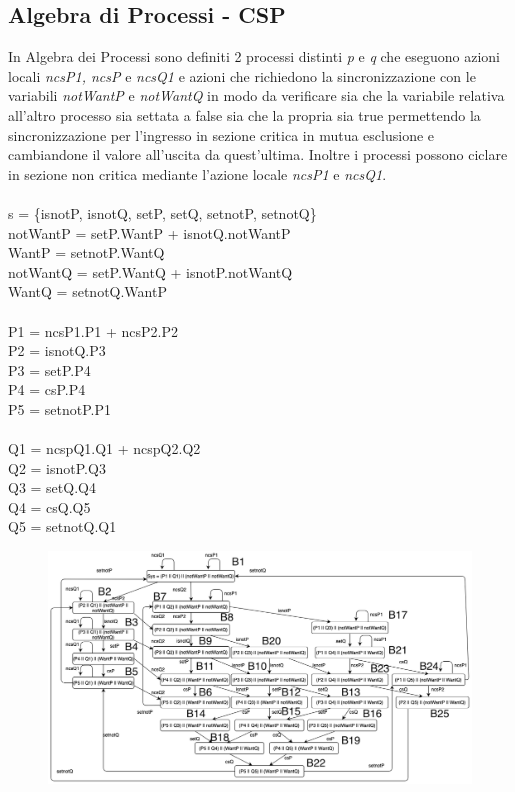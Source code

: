 \documentclass{article}
\begin{document}
\subsection{Algebra di Processi - CSP}
In Algebra dei Processi sono definiti 2 processi distinti \textit{p} e \textit{q} che eseguono azioni locali \textit{ncsP1, ncsP} e \textit{ncsQ1} e azioni che richiedono la sincronizzazione con le variabili \textit{notWantP} e \textit{notWantQ} in modo da verificare sia che la variabile relativa all'altro processo sia settata a false sia che la propria sia true permettendo la sincronizzazione per l'ingresso in sezione critica in mutua esclusione e cambiandone il valore all'uscita da quest'ultima. Inoltre i processi possono ciclare in sezione non critica mediante l'azione locale \textit{ncsP1} e \textit{ncsQ1}.
\\\\s = \{isnotP, isnotQ, setP, setQ, setnotP, setnotQ\}
\\notWantP = setP.WantP + isnotQ.notWantP
\\WantP =  setnotP.WantQ
\\notWantQ = setP.WantQ + isnotP.notWantQ 
\\WantQ = setnotQ.WantP
\\
\\P1 = ncsP1.P1 + ncsP2.P2 
\\P2 = isnotQ.P3
\\P3 = setP.P4
\\P4 = csP.P4
\\P5 = setnotP.P1
\\
\\Q1 = ncspQ1.Q1 + ncspQ2.Q2
\\Q2 = isnotP.Q3
\\Q3 = setQ.Q4
\\Q4 = csQ.Q5
\\Q5 = setnotQ.Q1
\begin{figure}[h] 
\centering
\includegraphics[scale=0.45]{CSP3.6.png}
\end{figure}
\end{document}
